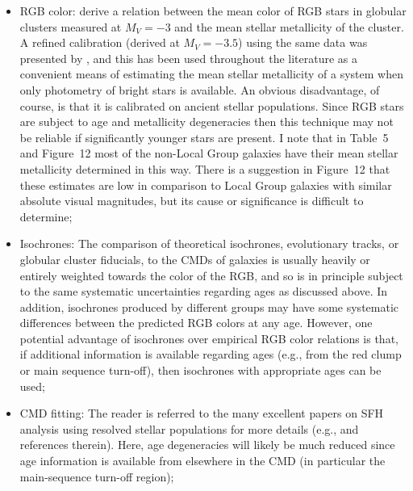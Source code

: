 \documentclass[manuscript]{aastex}
\begin{document}
\begin{itemize}

\item RGB color: \cite{dacosta1990} derive a relation between the mean
  color of RGB stars in globular clusters measured at $M_V = -3$ and
  the mean stellar metallicity of the cluster. A refined calibration
  (derived at $M_V = -3.5$) using the same data was presented by
  \cite{lee1993a}, and this has been used throughout the literature as
  a convenient means of estimating the mean stellar metallicity of a system
  when only photometry of bright stars is available. An obvious
  disadvantage, of course, is that it is calibrated on ancient stellar
  populations. Since RGB stars are subject to age and metallicity
  degeneracies then this technique may not be reliable if
  significantly younger stars are present. I note that in Table~5 and
  Figure~12 most of the non-Local Group galaxies have their mean stellar
  metallicity determined in this way. There is a suggestion in
  Figure~12 that these estimates are low in comparison to Local Group
  galaxies with similar absolute visual magnitudes, but its cause or
  significance is difficult to determine;

\item Isochrones: The comparison of theoretical isochrones,
  evolutionary tracks, or globular cluster fiducials, to the CMDs of
  galaxies is usually heavily or entirely weighted towards the color
  of the RGB, and so is in principle subject to the same systematic
  uncertainties regarding ages as discussed
  above. In addition, isochrones produced by different groups may have
  some systematic differences between the predicted RGB colors at any
  age. However, one potential advantage of isochrones over empirical
  RGB color relations is that, if additional information is available
  regarding ages (e.g., from the red clump or main sequence turn-off),
  then isochrones with appropriate ages can be used;

\item CMD fitting: The reader is referred to the many excellent papers
  on SFH analysis using resolved stellar populations for more details
  (e.g., \citealt{gallart2005,tolstoy2009} and references
  therein). Here, age degeneracies will likely be much reduced since
  age information is available from elsewhere in the CMD (in
  particular the main-sequence turn-off region);


\end{itemize}
\end{document}
